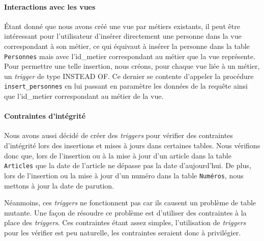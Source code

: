 \paragraph{Interactions avec les vues}{
    Étant donné que nous avons créé une vue par métiers existants, il peut être intéressant pour l'utilisateur d'insérer directement une personne dans la vue correspondant à son métier, ce qui équivaut à insérer la personne dans la table \verb|Personnes| mais avec l'id\_metier correspondant au métier que la vue représente. Pour permettre une telle insertion, nous créons, pour chaque vue liée à un métier, un \textit{trigger} de type INSTEAD OF. Ce dernier se contente d'appeler la procédure \verb|insert_personnes| en lui passant en paramètre les données de la requête ainsi que l'id\_metier correspondant au métier de la vue.
}

\paragraph{Contraintes d'intégrité}{
    Nous avons aussi décidé de créer des \textit{triggers} pour vérifier des contraintes d'intégrité lors des insertions et mises à jours dans certaines tables. Nous vérifions donc que, lors de l'insertion ou à la mise à jour d'un article dans la table \verb|Articles| que la date de l'article ne dépasse pas la date d'aujourd'hui. De plus, lors de l'insertion ou la mise à jour d'un numéro dans la table \verb|Numéros|, nous mettons à jour la date de parution.

    Néanmoins, ces \textit{triggers} ne fonctionnent pas car ils causent un problème de table mutante. Une façon de résoudre ce problème est d'utiliser des contraintes à la place des \textit{triggers}. Ces contraintes étant assez simples, l'utilisation de \textit{triggers} pour les vérifier est peu naturelle, les contraintes seraient donc à privilégier.
}
